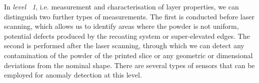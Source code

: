 In \emph{level ~1}, i.e. measurement and characterisation of layer properties, we can distinguish two further types of measurements. The first is conducted before laser scanning, which allows us to identify areas where the powder is not uniform, potential defects produced by the recoating system or super-elevated edges. The second is performed after the laser scanning, through which we can detect any contamination of the powder of the printed slice or any geometric or dimensional deviations from the nominal shape. There are several types of sensors that can be employed for anomaly detection at this level.
\begin{figure}
    \centering
    \qquad
\end{figure}
